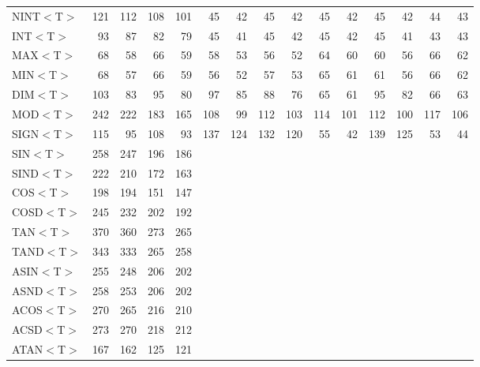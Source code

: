 \begin{table}[h]
\begin{center}
{\begin{tabular}{|l|r|r||r|r||r|r||r|r||r|r||r|r||r|r|}
NINT$<$T$>$ &  121 &  112 &  108 &  101 &   45 &   42 &   45 &   42 &   45 &   42 &   45 &   42 &   44 &   43 \\
INT$<$T$>$ &   93 &   87 &   82 &   79 &   45 &   41 &   45 &   42 &   45 &   42 &   45 &   41 &   43 &   43 \\
MAX$<$T$>$ &   68 &   58 &   66 &   59 &   58 &   53 &   56 &   52 &   64 &   60 &   60 &   56 &   66 &   62 \\
MIN$<$T$>$ &   68 &   57 &   66 &   59 &   56 &   52 &   57 &   53 &   65 &   61 &   61 &   56 &   66 &   62 \\
DIM$<$T$>$ &  103 &   83 &   95 &   80 &   97 &   85 &   88 &   76 &   65 &   61 &   95 &   82 &   66 &   63 \\
MOD$<$T$>$ &  242 &  222 &  183 &  165 &  108 &   99 &  112 &  103 &  114 &  101 &  112 &  100 &  117 &  106 \\
SIGN$<$T$>$ &  115 &   95 &  108 &   93 &  137 &  124 &  132 &  120 &   55 &   42 &  139 &  125 &   53 &   44 \\
SIN$<$T$>$ &  258 &  247 &  196 &  186 &      &      &      &      &      &      &      &      &      &      \\
SIND$<$T$>$ &  222 &  210 &  172 &  163 &      &      &      &      &      &      &      &      &      &      \\
COS$<$T$>$ &  198 &  194 &  151 &  147 &      &      &      &      &      &      &      &      &      &      \\
COSD$<$T$>$ &  245 &  232 &  202 &  192 &      &      &      &      &      &      &      &      &      &      \\
TAN$<$T$>$ &  370 &  360 &  273 &  265 &      &      &      &      &      &      &      &      &      &      \\
TAND$<$T$>$ &  343 &  333 &  265 &  258 &      &      &      &      &      &      &      &      &      &      \\
ASIN$<$T$>$ &  255 &  248 &  206 &  202 &      &      &      &      &      &      &      &      &      &      \\
ASND$<$T$>$ &  258 &  253 &  206 &  202 &      &      &      &      &      &      &      &      &      &      \\
ACOS$<$T$>$ &  270 &  265 &  216 &  210 &      &      &      &      &      &      &      &      &      &      \\
ACSD$<$T$>$ &  273 &  270 &  218 &  212 &      &      &      &      &      &      &      &      &      &      \\
ATAN$<$T$>$ &  167 &  162 &  125 &  121 &      &      &      &      &      &      &      &      &      &      \\

\end{tabular}}
\end{center}
\end{table}
